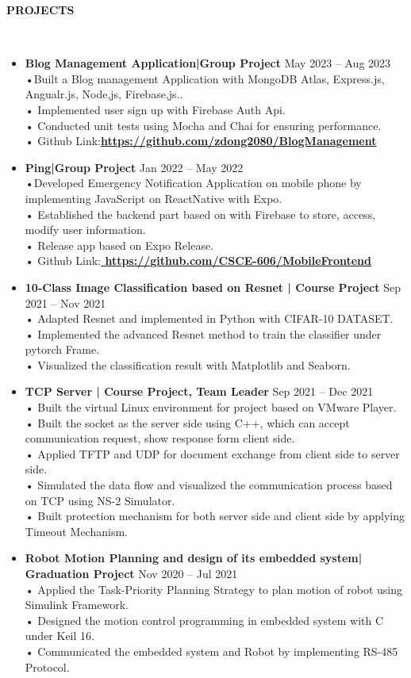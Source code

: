 \documentclass[a4paper,10pt]{article}
\newcommand{\lsep}{-0.5cm}
\newcommand{\resheading}[1]{{\small \colorbox{mygrey}{\begin{minipage}{0.975\textwidth}{\textbf{#1 \vphantom{p\^{E}}}}\end{minipage}}}}
\begin{document}
\resheading{\textbf{PROJECTS} }\\[\lsep]
\begin{itemize}
\setlength\itemsep{0em}
\item \textbf{Blog Management Application\!|Group Project} \hfill May 2023 – Aug 2023 \\
•Built a Blog management Application with MongoDB Atlas, Express.js, Angualr.js, Node,js, Firebase,js..\\
• Implemented user sign up with Firebase Auth Api.\\
• Conducted unit tests using Mocha and Chai for ensuring performance.\\
• Github Link:\textbf{\url{https://github.com/zdong2080/BlogManagement}}
\item \textbf{Ping\!|Group Project} \hfill Jan 2022 – May 2022 \\
•Developed Emergency Notification Application on mobile phone by implementing JavaScript on ReactNative with Expo.\\
• Established the backend part based on with Firebase to store, access, modify user information.\\
• Release app based on Expo Release.\\
• Github Link:\textbf{\url{ https://github.com/CSCE-606/MobileFrontend}}
\item \textbf{10-Class Image Classification based on Resnet | Course Project} \hfill Sep 2021 – Nov 2021\\
• Adapted Resnet and implemented in Python with CIFAR-10 DATASET.\\
• Implemented the advanced Resnet method to train the classifier under pytorch Frame.\\
• Visualized the classification result with Matplotlib and Seaborn.
\item \textbf{TCP Server | Course Project, Team Leader} \hfill Sep 2021 – Dec 2021\\
• Built the virtual Linux environment for project based on VMware Player.\\
• Built the socket as the server side using C++, which can accept communication request, show response
form client side.\\
• Applied TFTP and UDP for document exchange from client side to server side.\\
• Simulated the data flow and visualized the communication process based on TCP using NS-2 Simulator.\\
• Built protection mechanism for both server side and client side by applying Timeout Mechanism. 
\item \textbf{Robot Motion Planning and design of its embedded system| Graduation Project} \hfill Nov 2020 – Jul 2021\\
• Applied the Task-Priority Planning Strategy to plan motion of robot using Simulink Framework.\\
• Designed the motion control programming in embedded system with C under Keil 16.\\
• Communicated the embedded system and Robot by implementing RS-485 Protocol.
\end{itemize}
\end{document}
